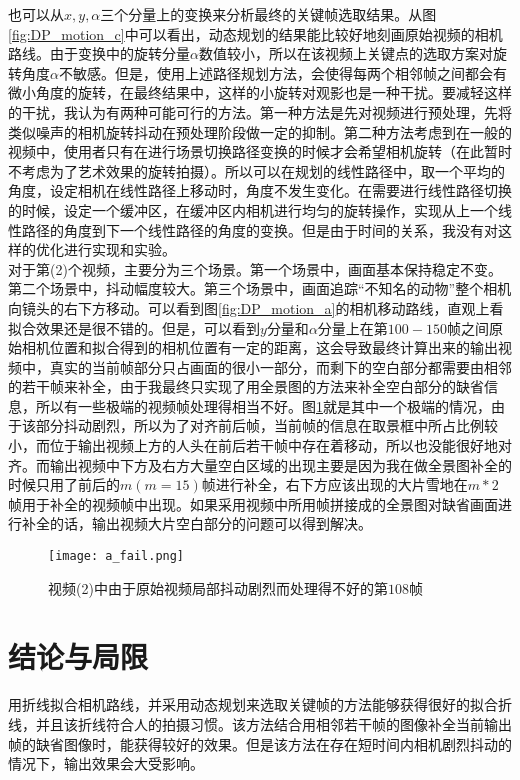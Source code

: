 \documentclass[journal, a4paper]{IEEEtran}
\begin{document}
    也可以从$x,y,\alpha$三个分量上的变换来分析最终的关键帧选取结果。从图\ref{fig:DP_motion_c}中可以看出，动态规划的结果能比较好地刻画原始视频的相机路线。由于变换中的旋转分量$\alpha$数值较小，所以在该视频上关键点的选取方案对旋转角度$\alpha$不敏感。但是，使用上述路径规划方法，会使得每两个相邻帧之间都会有微小角度的旋转，在最终结果中，这样的小旋转对观影也是一种干扰。要减轻这样的干扰，我认为有两种可能可行的方法。第一种方法是先对视频进行预处理，先将类似噪声的相机旋转抖动在预处理阶段做一定的抑制。第二种方法考虑到在一般的视频中，使用者只有在进行场景切换路径变换的时候才会希望相机旋转（在此暂时不考虑为了艺术效果的旋转拍摄）。所以可以在规划的线性路径中，取一个平均的角度，设定相机在线性路径上移动时，角度不发生变化。在需要进行线性路径切换的时候，设定一个缓冲区，在缓冲区内相机进行均匀的旋转操作，实现从上一个线性路径的角度到下一个线性路径的角度的变换。但是由于时间的关系，我没有对这样的优化进行实现和实验。\\
    
    对于第(2)个视频，主要分为三个场景。第一个场景中，画面基本保持稳定不变。第二个场景中，抖动幅度较大。第三个场景中，画面追踪“不知名的动物”整个相机向镜头的右下方移动。可以看到图\ref{fig:DP_motion_a}的相机移动路线，直观上看拟合效果还是很不错的。但是，可以看到$y$分量和$\alpha$分量上在第$100-150$帧之间原始相机位置和拟合得到的相机位置有一定的距离，这会导致最终计算出来的输出视频中，真实的当前帧部分只占画面的很小一部分，而剩下的空白部分都需要由相邻的若干帧来补全，由于我最终只实现了用全景图的方法来补全空白部分的缺省信息，所以有一些极端的视频帧处理得相当不好。图\ref{fig:a_fail}就是其中一个极端的情况，由于该部分抖动剧烈，所以为了对齐前后帧，当前帧的信息在取景框中所占比例较小，而位于输出视频上方的人头在前后若干帧中存在着移动，所以也没能很好地对齐。而输出视频中下方及右方大量空白区域的出现主要是因为我在做全景图补全的时候只用了前后的$m(m=15)$帧进行补全，右下方应该出现的大片雪地在$m*2$帧用于补全的视频帧中出现。如果采用视频中所用帧拼接成的全景图对缺省画面进行补全的话，输出视频大片空白部分的问题可以得到解决。\\
    
    \begin{figure}[!hbt]
    \begin{center}
    \texttt{[image: a\_fail.png]}
    \caption{视频(2)中由于原始视频局部抖动剧烈而处理得不好的第$108$帧}
    \label{fig:a_fail}
    \end{center}
  \end{figure}
    
\section{结论与局限}
  用折线拟合相机路线，并采用动态规划来选取关键帧的方法能够获得很好的拟合折线，并且该折线符合人的拍摄习惯。该方法结合用相邻若干帧的图像补全当前输出帧的缺省图像时，能获得较好的效果。但是该方法在存在短时间内相机剧烈抖动的情况下，输出效果会大受影响。\\
    
\end{document}
